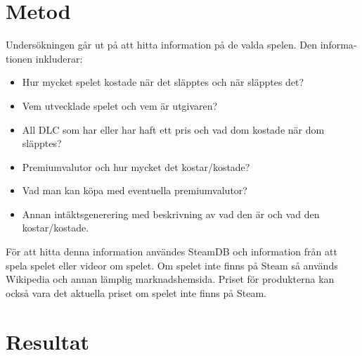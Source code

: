 \documentclass[11p]{article}
\begin{document}
\begin{otherlanguage}{swedish}
\section{Metod}

     Undersökningen går ut på att hitta information på de valda spelen.
     Den informationen inkluderar:
     \begin{itemize}
         \item Hur mycket spelet kostade när det släpptes och när släpptes det?
         \item Vem utvecklade spelet och vem är utgivaren?
         \item All DLC som har eller har haft ett pris och vad dom kostade när dom släpptes?
         \item Premiumvalutor och hur mycket det kostar/kostade?
         \item Vad man kan köpa med eventuella premiumvalutor?
         \item Annan intäktsgenerering med beskrivning av vad den är och vad den kostar/kostade.
     \end{itemize}
    För att hitta denna information användes SteamDB och information från att spela spelet eller videor om spelet.
    Om spelet inte finns på Steam så används Wikipedia och annan lämplig marknadshemsida.
    Priset för produkterna kan också vara det aktuella priset om spelet inte finns på Steam.

\section{Resultat}




\end{otherlanguage}
\end{document}
